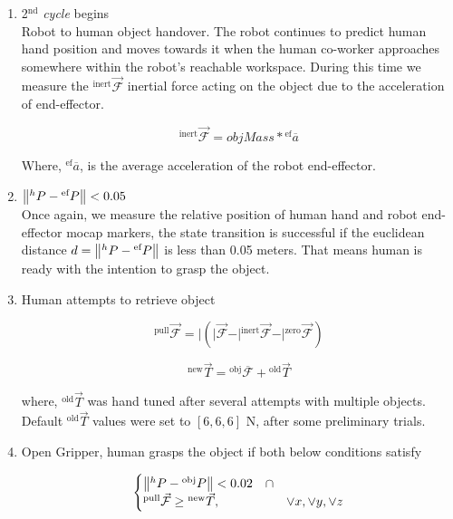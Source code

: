 \begin{enumerate}[start=0,label={\bf{t}\arabic*:}]
    \item 2$^\text{nd}$ \textit{cycle} begins\\
    Robot to human object handover. The robot continues to predict human hand position and moves towards it when the human co-worker approaches somewhere within the robot's reachable workspace. During this time we measure the ${}^\text{inert}\vec{\mathcal{F}}$ inertial force acting on the object due to the acceleration of end-effector.

    \begin{equation}
        {}^\text{inert}\vec{\mathcal{F}}  = objMass * {}^{\text{ef}}\overline{a}
    \end{equation}

    Where, ${}^{\text{ef}}\overline{a}$, is the average acceleration of the robot end-effector.

    \item $\norm{{}^h{P} - {}^{\text{ef}}{P}} < 0.05$\\
    Once again, we measure the relative position of human hand and robot end-effector mocap markers, the state transition is successful if the euclidean distance $d = \norm{{}^h{P} - {}^{\text{ef}}{P}}$ is less than 0.05 meters. That means human is ready with the intention to grasp the object.
    
    \item Human attempts to retrieve object
    
    \begin{equation}
    {}^\text{pull}\vec{\mathcal{F}} = \vert{ (\vert{\vec{\mathcal{F}}} - \vert{{}^\text{inert}\vec{\mathcal{F}}} - \vert{{}^\text{zero}\vec{\mathcal{F}}}) }
    \end{equation}
    
    \begin{equation}
    {}^\text{new}\vec{T} = {}^\text{obj}\overline{\mathcal{F}} + {}^\text{old}\vec{T}
    \end{equation}
    
    where, ${}^\text{old}\vec{T}$ was hand tuned after several attempts with multiple objects. Default ${}^\text{old}\vec{T}$ values were set to $[6, 6, 6]$ N, after some preliminary trials. 
    
    \item Open Gripper, human grasps the object if both below conditions satisfy

    \begin{equation}\label{Fpull}
    \begin{cases}
     \norm{{}^h{P} - {}^\text{obj}{P}} < 0.02 \quad \cap  \\
     {}^\text{pull}\vec{\mathcal{F}}\geq {}^\text{new}\vec{T}, & \lor x, \lor y, \lor z
   \end{cases}
   \end{equation}


\end{enumerate}
